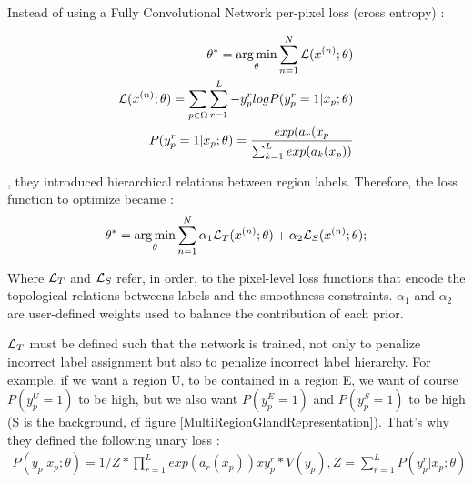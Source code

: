     Instead of using a Fully Convolutional Network per-pixel loss (cross entropy) : 
    
    \begin{center}
      \begin{align}
          \theta^* = \operatorname*{arg\,min}_\theta \sum_{n=1}^N \mathcal{L}(x^{(n)};\theta) \\
          \mathcal{L}(x^{(n)};\theta) = \sum_{p\in\Omega}\sum_{r=1}^L -y_p^r log P(y_p^r = 1 | x_p; \theta)\\
          P(y_p^r = 1 | x_p; \theta) = \frac{exp(a_r(x_p}{\sum_{k=1}^L exp(a_k(x_p))}
      \end{align}
    \end{center}
    
    , they introduced hierarchical relations between region labels. Therefore, the loss function to optimize became : 
    \begin{align*}
    	\theta^* = \operatorname*{arg\,min}_\theta \sum_{n=1}^N \alpha_1 \mathcal{L}_T(x^{(n)}; \theta) + \alpha_2 \mathcal{L}_S(x^{(n)}; \theta);
    \end{align*}
    
    Where $\mathcal{L}_T$ and $\mathcal{L}_S$ refer, in order, to the pixel-level loss functions that encode the topological relations betweens labels and the smoothness constraints. $\alpha_1$ and $\alpha_2$ are user-defined weights used to balance the contribution of each prior.
    
    $\mathcal{L}_T$ must be defined such that the network is trained, not only to penalize incorrect label assignment but also to penalize incorrect label hierarchy. For example, if we want a region U, to be contained in a region E, we want of course $P(y_p^U=1)$ to be high, but we also want $P(y_p^E=1)$ and $P(y_p^S=1)$ to be high (S is the background, cf figure \ref{MultiRegionGlandRepresentation}). That's why they defined the following unary loss : 
    \begin{align}
    	P(y_p | x_p; \theta) = 1/Z * \prod_{r=1}^L exp(a_r(x_p)) x y_p^r * V(y_p), Z =\sum_{r=1}^L P(y_p^r | x_p; \theta) 
    \end{align}
    
    
    
    
    